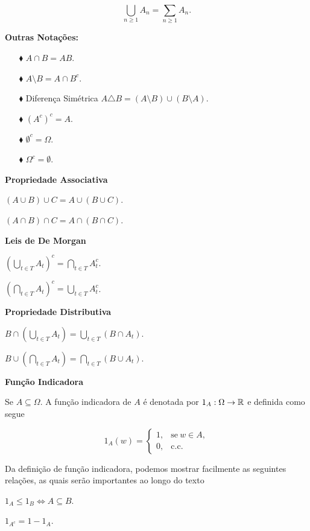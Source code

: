 $$
	\displaystyle\bigcup_{n \geqslant 1}{A_n} = \sum_{n \geqslant 1} A_n.	
$$

\textbf{Outras Notações:}

\begin{enumerate}
\item[$\blacklozenge$] $ A \cap B = AB$.
\item[$\blacklozenge$] $A \setminus B = A \cap B^c$.
\item[$\blacklozenge$] Diferença Simétrica $A\triangle B = (A \setminus B) \cup (B\setminus A).$
\item[$\blacklozenge$] $(A^c)^c = A $.
\item[$\blacklozenge$] $\emptyset^c = \Omega$.
\item[$\blacklozenge$] $\Omega^c = \emptyset$.
\end{enumerate}

\textbf{Propriedade Associativa}

$(A\cup B)\cup C= A \cup ( B \cup C)$.

$(A\cap B)\cap C= A \cap ( B \cap C)$.

\vspace*{1cm}
\textbf{Leis de De Morgan}

$\left( \displaystyle\bigcup_{t \in T}{A_t} \right)^c = \displaystyle\bigcap_{t \in T}{A_t^c}$.

$\left( \displaystyle\bigcap_{t \in T}{A_t} \right)^c = \displaystyle\bigcup_{t \in T}{A_t^c}$.


\vspace*{1cm}
\textbf{Propriedade Distributiva}

$B \cap \left( \displaystyle\bigcup_{t \in T}{A_t} \right) = \displaystyle\bigcup_{t \in T}{(B\cap A_t)} $.

$B \cup \left( \displaystyle\bigcap_{t \in T}{A_t} \right) = \displaystyle\bigcap_{t \in T}{(B\cup A_t)} $.

\vspace*{1cm}
\textbf{Função Indicadora}

Se $A \subseteq \Omega$. A função indicadora de $A$ é denotada por $1_A: \Omega \to \mathbb{R}$ e definida 
como segue

$$
	1_A(w) =
	\begin{cases}
		1, & \text{se}\ w \in A, \\
		0, & \text{c.c.}
	\end{cases}
$$

\begin{observacao} Da definição de função indicadora, podemos mostrar facilmente 
as seguintes relações,
as quais serão importantes ao longo do texto

$1_A \leqslant 1_B \Leftrightarrow A \subseteq B$.

$1_{A^c}= 1- 1_A$.
\end{observacao}


